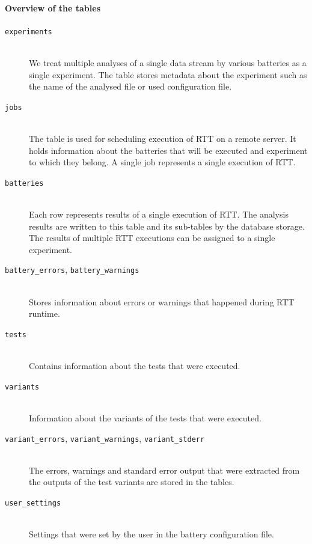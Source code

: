 \documentclass[
	digital,    %
	oneside,
	color,
	11pt,
	nocover,
	notable,
	nolof,
	nolot,
]{fithesis3}
\theoremstyle{definition}
\theoremstyle{remark}
\begin{document}
\paragraph*{Overview of the tables}
\begin{description}
\item[\texttt{experiments}] \hfill \\
We treat multiple analyses of a single data stream by various batteries as a single experiment. The table stores metadata about the experiment such as the name of the analysed file or used configuration file.

\item[\texttt{jobs}] \hfill \\
The table is used for scheduling execution of RTT on a remote server. It holds information about the batteries that will be executed and experiment to which they belong. A single job represents a single execution of RTT.

\item[\texttt{batteries}] \hfill \\
Each row represents results of a single execution of RTT. The analysis results are written to this table and its sub-tables by the database storage. The results of multiple RTT executions can be assigned to a single experiment.

\item[\texttt{battery\_errors}, \texttt{battery\_warnings}] \hfill \\
Stores information about errors or warnings that happened during RTT runtime.

\item[\texttt{tests}] \hfill \\
Contains information about the tests that were executed.

\item[\texttt{variants}] \hfill \\
Information about the variants of the tests that were executed.

\item[\texttt{variant\_errors}, \texttt{variant\_warnings}, \texttt{variant\_stderr}] \hfill \\
The errors, warnings and standard error output that were extracted from the outputs of the test variants are stored in the tables.

\item[\texttt{user\_settings}] \hfill \\
Settings that were set by the user in the battery configuration file.


\end{description}
\end{document}
